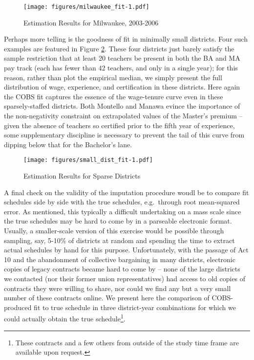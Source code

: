 \documentclass[12pt,]{article}
\let\rmarkdownfootnote\footnote%
\def\footnote{\protect\rmarkdownfootnote}
\begin{document}
\begin{figure}[htbp]
\centering
\texttt{[image: figures/milwaukee\_fit-1.pdf]}
\caption{\label{fig:mwk_fit}Estimation Results for Milwaukee, 2003-2006}
\end{figure}

Perhaps more telling is the goodness of fit in minimally small
districts. Four such examples are featured in Figure
\ref{fig:small_fit}. These four districts just barely satisfy the sample
restriction that at least 20 teachers be present in both the BA and MA
pay track (each has fewer than 42 teachers, and only in a single year);
for this reason, rather than plot the empirical median, we simply
present the full distribution of wage, experience, and certification in
these districts. Here again the COBS fit captures the essence of the
wage-tenure curve even in these sparsely-staffed districts. Both
Montello and Manawa evince the importance of the non-negativity
constraint on extrapolated values of the Master's premium -- given the
absence of teachers so certified prior to the fifth year of experience,
some supplementary discipline is necessary to prevent the tail of this
curve from dipping below that for the Bachelor's lane.

\begin{figure}[htbp]
\centering
\texttt{[image: figures/small\_dist\_fit-1.pdf]}
\caption{\label{fig:small_fit}Estimation Results for Sparse Districts}
\end{figure}

A final check on the validity of the imputation procedure woudl be to
compare fit schedules side by side with the true schedules, e.g.~through
root mean-squared error. As mentioned, this typically a difficult
undertaking on a mass scale since the true schedules may be hard to come
by in a parseable electronic format. Usually, a smaller-scale version of
this exercise would be possible through sampling, say, 5-10\% of
districts at random and spending the time to extract actual schedules by
hand for this purpose. Unfortunately, with the passage of Act 10 and the
abandonment of collective bargaining in many districts, electronic
copies of legacy contracts became hard to come by -- none of the large
districts we contacted (nor their former union representatives) had
access to old copies of contracts they were willing to share, nor could
we find any but a very small number of these contracts online. We
present here the comparison of COBS-produced fit to true schedule in
three district-year combinations for which we could actually obtain the
true schedule\footnote{These contracts and a few others from outside of
  the study time frame are available upon request.}.
\end{document}
